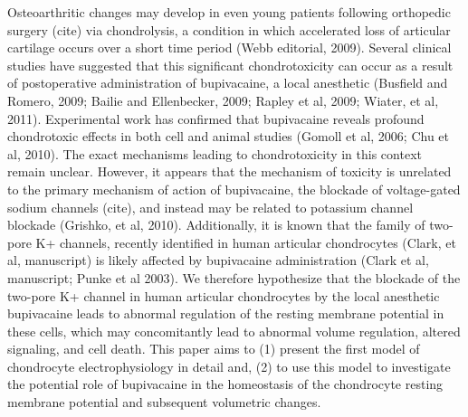 Osteoarthritic changes may develop in even young patients following
orthopedic surgery (cite) via chondrolysis, a condition in which
accelerated loss of articular cartilage occurs over a short time
period (Webb editorial, 2009).  Several clinical studies have
suggested that this significant chondrotoxicity can occur as a result
of postoperative administration of bupivacaine, a local anesthetic
(Busfield and Romero, 2009; Bailie and Ellenbecker, 2009; Rapley et
al, 2009; Wiater, et al, 2011).  Experimental work has confirmed that
bupivacaine reveals profound chondrotoxic effects in both cell
\citep{Chuetal2006} and animal studies (Gomoll et al, 2006; Chu et al,
2010).  The exact mechanisms leading to chondrotoxicity in this
context remain unclear.  However, it appears that the mechanism of
toxicity is unrelated to the primary mechanism of action of
bupivacaine, the blockade of voltage-gated sodium channels (cite), and
instead may be related to potassium channel blockade (Grishko, et al,
2010).  Additionally, it is known that the family of two-pore K+
channels, recently identified in human articular chondrocytes (Clark,
et al, manuscript) is likely affected by bupivacaine administration
(Clark et al, manuscript; Punke et al 2003).  We therefore hypothesize
that the blockade of the two-pore K+ channel in human articular
chondrocytes by the local anesthetic bupivacaine leads to abnormal
regulation of the resting membrane potential in these cells, which may
concomitantly lead to abnormal volume regulation, altered signaling,
and cell death.  This paper aims to (1) present the first
model of chondrocyte electrophysiology in detail and, (2) to use this
model to investigate the potential role of bupivacaine in the homeostasis of the
chondrocyte resting membrane potential and subsequent volumetric changes.


